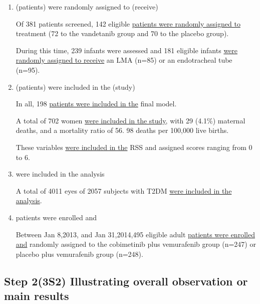 \documentclass[a4paper]{ctexbook}
\begin{document}
    \begin{enumerate}
      \item (patients) were randomly assigned to (receive)
      \begin{eg}{}
        Of 381 patients screened, 142 eligible \uline{patients were randomly assigned to} treatment (72 to the vandetanib group and 70 to the placebo group).
      \end{eg}

      \begin{eg}{}
        During this time, 239 infants were assessed and 181 eligible infants \uline{were randomly assigned to receive} an LMA (n=85) or an endotracheal tube (n=95).    
      \end{eg}

      \item (patients) were included in the (study)
      \begin{eg}{}
        In all, 198 \uline{patients were included in the} final model.
      \end{eg}

      \begin{eg}{}
        A total of 702 women \uline{were included in the study}, with 29 (4.1\%) maternal deaths, and a mortality ratio of 56. 98 deaths per 100,000 live births.  
      \end{eg}

      \begin{eg}{}
        These variables \uline{were included in the} RSS and assigned scores ranging from 0 to 6. 
      \end{eg}

      \item were included in the analysis
      \begin{eg}{}
        A total of 4011 eyes of 2057 subjects with T2DM \uline{were included in the analysis}.
      \end{eg}

      \item patients were enrolled and
      \begin{eg}{}
        Between Jan 8,2013, and Jan 31,2014,495 eligible adult \uline{patients were enrolled and} randomly assigned to the cobimetinib plus vemurafenib group (n=247) or placebo plus vemurafenib group (n=248).   
      \end{eg}
    \end{enumerate}

  \subsection{Step 2(3S2) Illustrating overall observation or main results}
\end{document}
